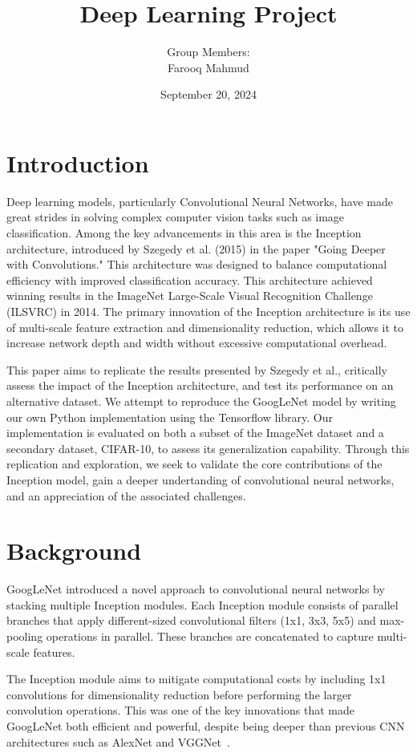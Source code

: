 \documentclass{article}
\title{Deep Learning Project}
\author{
    Group Members: \\
    Farooq Mahmud
}
\date{September 20, 2024}
\begin{document}
\maketitle

\section{Introduction}
Deep learning models, particularly Convolutional Neural Networks, have made great strides in solving complex computer vision tasks such as image classification. Among the key advancements in this area is the Inception architecture, introduced by Szegedy et al. (2015) in the paper "Going Deeper with Convolutions." This architecture was designed to balance computational efficiency with improved classification accuracy. This architecture achieved winning results in the ImageNet Large-Scale Visual Recognition Challenge (ILSVRC) in 2014. The primary innovation of the Inception architecture is its use of multi-scale feature extraction and dimensionality reduction, which allows it to increase network depth and width without excessive computational overhead\cite{szegedy2015going}.

This paper aims to replicate the results presented by Szegedy et al., critically assess the impact of the Inception architecture, and test its performance on an alternative dataset. We attempt to reproduce the GoogLeNet model by writing our own Python implementation using the Tensorflow library. Our implementation is evaluated on both a subset of the ImageNet dataset and a secondary dataset, CIFAR-10, to assess its generalization capability. Through this replication and exploration, we seek to validate the core contributions of the Inception model, gain a deeper undertanding of convolutional neural networks, and an appreciation of the associated challenges.


\section{Background}

GoogLeNet introduced a novel approach to convolutional neural networks by stacking multiple Inception modules. Each Inception module consists of parallel branches that apply different-sized convolutional filters (1x1, 3x3, 5x5) and max-pooling operations in parallel. These branches are concatenated to capture multi-scale features.

The Inception module aims to mitigate computational costs by including 1x1 convolutions for dimensionality reduction before performing the larger convolution operations. This was one of the key innovations that made GoogLeNet both efficient and powerful, despite being deeper than previous CNN architectures such as AlexNet and VGGNet~\cite{krizhevsky2012imagenet, simonyan2015vgg}.
\end{document}

